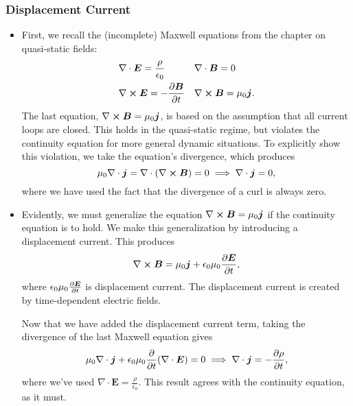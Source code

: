 \documentclass[11pt, a4paper]{article}
\renewcommand{\vec}[1]{\bm{#1}} %
\newcommand{\E}{\vec{E}} %
\newcommand{\B}{\vec{B}} %
\newcommand{\ee}{\epsilon_{0}}  %
\newcommand{\mm}{\mu_{0}}  %
\renewcommand{\j}{\vec{j}}  %
\renewcommand{\div}{\nabla \cdot}
\renewcommand{\curl}{\nabla \cross}
\begin{document}
\subsubsection{Displacement Current}
\begin{itemize}
	\item First, we recall the (incomplete) Maxwell equations from the chapter on quasi-static fields:
	\begin{align*}
		&\div \E = \frac{\rho}{\ee} && \div \B = 0\\
		& \curl \E = - \pdv{\B}{t} && \curl \B = \mm \j.
	\end{align*}
	The last equation, $ \curl \B = \mm \j $, is based on the assumption that all current loops are closed. This holds in the quasi-static regime, but violates the continuity equation for more general dynamic situations. To explicitly show this violation, we take the equation's divergence, which produces
	\begin{equation*}
		\mm \div \j = \div (\curl \B) = 0 \implies \div \j = 0,
	\end{equation*}
    where we have used the fact that the divergence of a curl is always zero. 

    \item Evidently, we must generalize the equation $ \curl \B = \mm \j $ if the continuity equation is to hold. We make this generalization by introducing a displacement current. This produces
	\begin{equation*}
		\curl \B = \mm \j + \ee \mm \pdv{\E}{t},
	\end{equation*}
	where $ \ee \mm \pdv{\E}{t} $ is displacement current. The displacement current is created by time-dependent electric fields. 

    Now that we have added the displacement current term, taking the divergence of the last Maxwell equation gives
	\begin{equation*}
		\mm \div \j + \ee \mm \pdv{t}(\div \E) = 0 \implies \div \j = - \pdv{\rho}{t},
	\end{equation*}
	where we've used $ \div \E = \frac{\rho}{\ee} $. This result agrees with the continuity equation, as it must.
	
\end{itemize}
\end{document}
